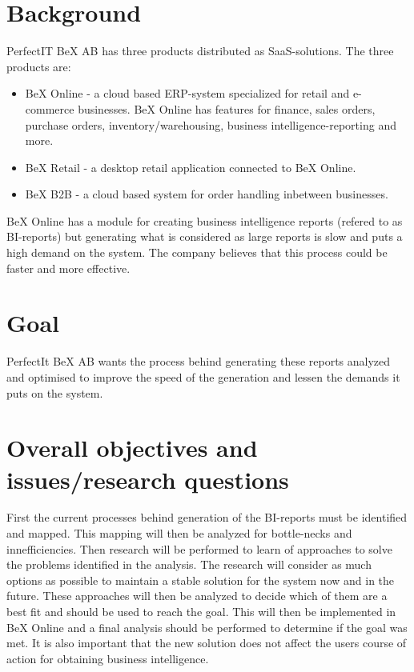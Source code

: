 \documentclass[12pt,a4paper]{article}
\begin{document}
\section*{Background}
PerfectIT BeX AB has three products distributed as SaaS-solutions. The three products are:
\begin{itemize}
\item BeX Online - a cloud based ERP-system specialized for retail and e-commerce businesses. BeX Online has features for finance, sales orders, purchase orders, inventory/warehousing, business intelligence-reporting and more. 
\item BeX Retail - a desktop retail application connected to BeX Online.
\item BeX B2B - a cloud based system for order handling inbetween businesses.
\end{itemize}

BeX Online has a module for creating business intelligence reports (refered to as BI-reports) but generating what is considered as large reports is slow and puts a high demand on the system. The company believes that this process could be faster and more effective. 


\section*{Goal}
PerfectIt BeX AB wants the process behind generating these reports analyzed and optimised to improve the speed of the generation and lessen the demands it puts on the system.

\section*{Overall objectives and issues/research questions}
First the current processes behind generation of the BI-reports must be identified and mapped. This mapping will then be analyzed for bottle-necks and innefficiencies. Then research will be performed to learn of approaches to solve the problems identified in the analysis. The research will consider as much options as possible to maintain a stable solution for the system now and in the future.
These approaches will then be analyzed to decide which of them are a best fit and should be used to reach the goal. This will then be implemented in BeX Online and a final analysis should be performed to determine if the goal was met.
 It is also important that the new solution does not affect the users course of action for obtaining business intelligence.
\end{document}
